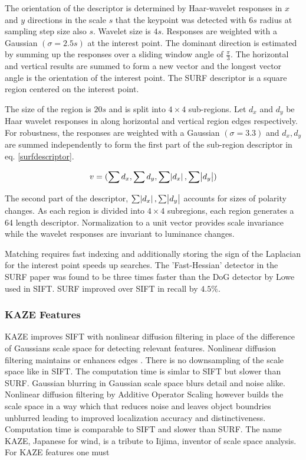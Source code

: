 \documentclass[english,12pt,a4paper,pdftex,elec,utf8]{aaltothesis}
\begin{document}
The orientation of the descriptor is determined by Haar-wavelet responses in $x$ and $y$ directions in the scale $s$ that the keypoint was detected with $6s$ radius at sampling step size also $s$. Wavelet size is $4s$. Responses are weighted with a Gaussian $(\sigma = 2.5s)$ at the interest point. The dominant direction is estimated by summing up the responses over a sliding window angle of $\frac{\pi}{3}$. The horizontal and vertical results are summed to form a new vector and the longest vector angle is the orientation of the interest point. The SURF descriptor is a square region centered on the interest point. \cite{Bay2006}

The size of the region is $20s$ and is split into $4 \times 4$ sub-regions. Let $d_x$ and $d_y$ be Haar wavelet responses in along horizontal and vertical region edges respectively. For robustness, the responses are weighted with a Gaussian $(\sigma = 3.3)$ and $d_x, d_y$ are summed independently to form the first part of the sub-region descriptor in eq. \ref{surfdescriptor}. \cite{Bay2006}

\begin{equation}
  \label{surfdescriptor}
v = (\sum d_x, \sum d_y, \sum \abs{d_x}, \sum \abs{d_y})
  \end{equation}

The second part of the descriptor, $\sum \abs{d_x}, \sum \abs{d_y}$ accounts for sizes of polarity changes. As each region is divided into $4 \times 4$ subregions, each region generates a 64 length descriptor. Normalization to a unit vector provides scale invariance while the wavelet responses are invariant to luminance changes. \cite{Bay2006}

Matching requires fast indexing and additionally storing the sign of the Laplacian for the interest point speeds up searches. The 'Fast-Hessian' detector in the SURF paper was found to be three times faster than the DoG detector by Lowe used in SIFT. SURF improved over SIFT in recall by $4.5\%$. \cite{Bay2006}

\subsubsection{KAZE Features}
KAZE improves SIFT with nonlinear diffusion filtering in place of the difference of Gaussians scale space for detecting relevant features. Nonlinear diffusion filtering maintains or enhances edges \cite{Weickert1998}. There is no downsampling of the scale space like in SIFT. The computation time is simlar to SIFT but slower than SURF. Gaussian blurring in Gaussian scale space blurs detail and noise alike. Nonlinear diffusion filtering by Additive Operator Scaling however builds the scale space in a way which that reduces noise and leaves object boundries unblurred leading to improved localization accuracy and distinctiveness. Computation time is comparable to SIFT and slower than SURF. The name KAZE, Japanese for wind, is a tribute to Iijima, inventor of scale space analysis. For KAZE features one must
\end{document}
